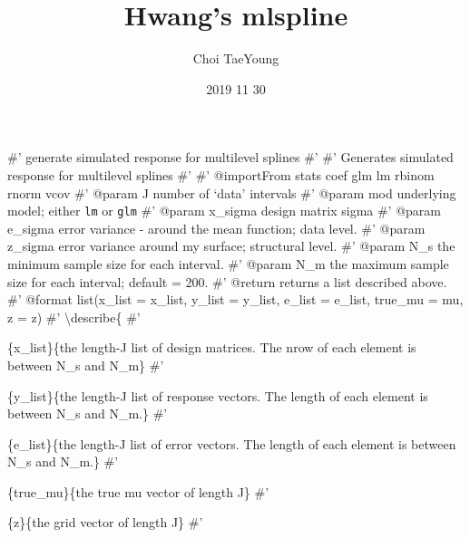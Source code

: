 \documentclass[
]{article}
\title{Hwang's mlspline}
\author{Choi TaeYoung}
\date{2019 11 30}
\begin{document}
\maketitle

\#' generate simulated response for multilevel splines \#' \#' Generates
simulated response for multilevel splines \#' \#' @importFrom stats coef
glm lm rbinom rnorm vcov \#' @param J number of `data' intervals \#'
@param mod underlying model; either \texttt{lm} or \texttt{glm} \#'
@param x\_sigma design matrix sigma \#' @param e\_sigma error variance -
around the mean function; data level. \#' @param z\_sigma error variance
around my surface; structural level. \#' @param N\_s the minimum sample
size for each interval. \#' @param N\_m the maximum sample size for each
interval; default = 200. \#' @return returns a list described above. \#'
@format list(x\_list = x\_list, y\_list = y\_list, e\_list = e\_list,
true\_mu = mu, z = z) \#' \textbackslash{}describe\{ \#'

\item

\{x\_list\}\{the length-J list of design matrices. The nrow of each
element is between N\_s and N\_m\} \#'

\item

\{y\_list\}\{the length-J list of response vectors. The length of each
element is between N\_s and N\_m.\} \#'

\item

\{e\_list\}\{the length-J list of error vectors. The length of each
element is between N\_s and N\_m.\} \#'

\item

\{true\_mu\}\{the true mu vector of length J\} \#'

\item

\{z\}\{the grid vector of length J\} \#'
\end{document}
